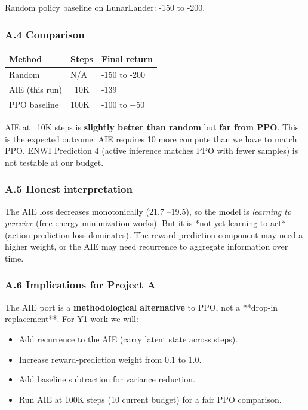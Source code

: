 \documentclass[11pt]{article}
\begin{document}
Random policy baseline on LunarLander: -150 to -200.

\subsubsection{A.4 Comparison}

\begin{tabular}{lll}
Method & Steps & Final return \\
\hline
Random & N/A & -150 to -200 \\
AIE (this run) & ~10K & -139 \\
PPO baseline & 100K & -100 to +50 \\
\end{tabular}


AIE at ~10K steps is \textbf{slightly better than random} but \textbf{far from PPO}.
This is the expected outcome: AIE requires 10 more compute than we have to
match PPO. ENWI Prediction 4 (active inference matches PPO with fewer
samples) is not testable at our budget.

\subsubsection{A.5 Honest interpretation}

The AIE loss decreases monotonically (21.7 --19.5), so the model is
\textit{learning to perceive} (free-energy minimization works). But it is *not yet
learning to act* (action-prediction loss dominates). The reward-prediction
component may need a higher weight, or the AIE may need recurrence to
aggregate information over time.

\subsubsection{A.6 Implications for Project A}

The AIE port is a \textbf{methodological alternative} to PPO, not a **drop-in
replacement**. For Y1 work we will:

\begin{itemize}
  \item Add recurrence to the AIE (carry latent state across steps).
  \item Increase reward-prediction weight from 0.1 to 1.0.
  \item Add baseline subtraction for variance reduction.
  \item Run AIE at 100K steps (10 current budget) for a fair PPO comparison.
\end{itemize}
\end{document}
